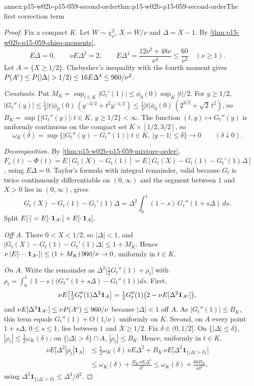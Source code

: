 \begin{annexitem}{annex:p15-w02b-p15-059-second-order}{thm:p15-w02b-p15-059-second-order}{The first correction term}
\begin{proof}
Fix a compact \(K\). Let \(W\sim\chi^2_\nu\), \(X=W/\nu\) and
\(\Delta=X-1\). By \cref{thm:p15-w02b-p15-059-chisq-moments},
\[
 E\Delta=0,\qquad \nu E\Delta^2=2,\qquad
 E\Delta^4=\frac{12\nu^2+48\nu}{\nu^4}\leq\frac{60}{\nu^2}\quad(\nu\geq1).
\]
Let \(A=\{X\geq1/2\}\). Chebyshev's inequality with the fourth moment gives
\(P(A^{\rm c})\leq P(|\Delta|>1/2)\leq16E\Delta^4\leq960/\nu^2\).

\emph{Constants.} Put \(M_K=\sup_{t\in K}|G_t'(1)|\leq
\phi_0(0)\sup_K|t|/2\). For \(y\geq1/2\),
\(|G_t''(y)|\leq\tfrac14|t|\phi_0(0)\,(y^{-3/2}+t^2y^{-1/2})
\leq\tfrac14|t|\phi_0(0)\,(2^{3/2}+\sqrt2\,t^2)\), so
\(B_K=\sup\{|G_t''(y)|:t\in K,\ y\geq1/2\}<\infty\). The function
\((t,y)\mapsto G_t''(y)\) is uniformly continuous on the compact set
\(K\times[1/2,3/2]\), so
\[
 \omega_K(\delta)=\sup\{|G_t''(y)-G_t''(1)|:t\in K,\ |y-1|\leq\delta\}
 \longrightarrow0\qquad(\delta\downarrow0).
\]

\emph{Decomposition.} By \cref{thm:p15-w02b-p15-059-mixture-order},
\(F_\nu(t)-\Phi(t)=E[G_t(X)-G_t(1)]=E[G_t(X)-G_t(1)-G_t'(1)\Delta]\),
using \(E\Delta=0\). Taylor's formula with integral remainder, valid
because \(G_t\) is twice continuously differentiable on \((0,\infty)\) and
the segment between \(1\) and \(X>0\) lies in \((0,\infty)\), gives
\[
 G_t(X)-G_t(1)-G_t'(1)\Delta
 =\Delta^2\int_0^1(1-s)\,G_t''(1+s\Delta)\,ds .
\]
Split \(E[\cdot]=E[\cdot\,\mathbf1_{A^{\rm c}}]+E[\cdot\,\mathbf1_A]\).

\emph{Off \(A\).} There \(0<X<1/2\), so \(|\Delta|<1\), and
\(|G_t(X)-G_t(1)-G_t'(1)\Delta|\leq1+M_K\). Hence
\(\nu\,|E[\cdots\mathbf1_{A^{\rm c}}]|\leq(1+M_K)\,960/\nu\to0\),
uniformly in \(t\in K\).

\emph{On \(A\).} Write the remainder as
\(\Delta^2\bigl[\tfrac12G_t''(1)+\rho_t\bigr]\) with
\(\rho_t=\int_0^1(1-s)\bigl(G_t''(1+s\Delta)-G_t''(1)\bigr)ds\).
First,
\[
 \nu E\bigl[\tfrac12G_t''(1)\Delta^2\mathbf1_A\bigr]
 =\tfrac12G_t''(1)\bigl(2-\nu E[\Delta^2\mathbf1_{A^{\rm c}}]\bigr),
\]
and \(\nu E[\Delta^2\mathbf1_{A^{\rm c}}]\leq\nu P(A^{\rm c})\leq960/\nu\)
because \(|\Delta|<1\) off \(A\). As \(|G_t''(1)|\leq B_K\), this term
equals \(G_t''(1)+O(1/\nu)\) uniformly on \(K\). Second, on \(A\) every
point \(1+s\Delta\), \(0\leq s\leq1\), lies between \(1\) and \(X\geq1/2\).
Fix \(\delta\in(0,1/2]\). On \(\{|\Delta|\leq\delta\}\),
\(|\rho_t|\leq\tfrac12\omega_K(\delta)\); on \(\{|\Delta|>\delta\}\cap A\),
\(|\rho_t|\leq B_K\). Hence, uniformly in \(t\in K\),
\[
\begin{aligned}
 \nu E\bigl[\Delta^2|\rho_t|\mathbf1_A\bigr]
 &\leq\tfrac12\omega_K(\delta)\,\nu E\Delta^2
   +B_K\,\nu E\bigl[\Delta^2\mathbf1_{\{|\Delta|>\delta\}}\bigr]\\
 &\leq\omega_K(\delta)+\frac{B_K\,\nu E\Delta^4}{\delta^2}
 \leq\omega_K(\delta)+\frac{60B_K}{\nu\delta^2},
\end{aligned}
\]
using \(\Delta^2\mathbf1_{\{|\Delta|>\delta\}}\leq\Delta^4/\delta^2\).


\end{proof}
\end{annexitem}
